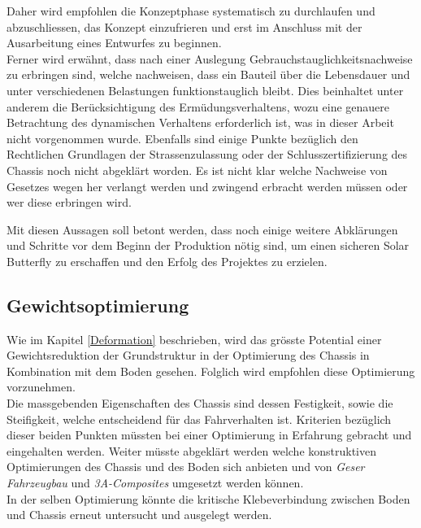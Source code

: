 Daher wird empfohlen die Konzeptphase systematisch zu durchlaufen und abzuschliessen, das Konzept einzufrieren und erst im Anschluss mit der Ausarbeitung eines Entwurfes zu beginnen.\\

Ferner wird erwähnt, dass nach einer Auslegung Gebrauchstauglichkeitsnachweise zu erbringen sind, welche nachweisen, dass ein Bauteil über die Lebensdauer und unter verschiedenen Belastungen funktionstauglich bleibt. Dies beinhaltet unter anderem die Berücksichtigung des Ermüdungsverhaltens, wozu eine genauere Betrachtung des dynamischen Verhaltens erforderlich ist, was in dieser Arbeit nicht vorgenommen wurde.
Ebenfalls sind einige Punkte bezüglich den Rechtlichen Grundlagen der Strassenzulassung oder der Schlusszertifizierung des Chassis noch nicht abgeklärt worden. Es ist nicht klar welche Nachweise von Gesetzes wegen her verlangt werden und zwingend erbracht werden müssen oder wer diese erbringen wird.

Mit diesen Aussagen soll betont werden, dass noch einige weitere Abklärungen und Schritte vor dem Beginn der Produktion nötig sind, um einen sicheren Solar Butterfly zu erschaffen und den Erfolg des Projektes zu erzielen.

\subsection{Gewichtsoptimierung}
Wie im Kapitel \ref{Deformation} beschrieben, wird das grösste Potential einer Gewichtsreduktion der Grundstruktur in der Optimierung des Chassis in Kombination mit dem Boden gesehen. Folglich wird empfohlen diese Optimierung vorzunehmen.\\
Die massgebenden Eigenschaften des Chassis sind dessen Festigkeit, sowie die Steifigkeit, welche entscheidend für das Fahrverhalten ist. Kriterien bezüglich dieser beiden Punkten müssten bei einer Optimierung in Erfahrung gebracht und eingehalten werden. Weiter müsste abgeklärt werden welche konstruktiven Optimierungen des Chassis und des Boden sich anbieten und von \emph{Geser Fahrzeugbau} und \emph{3A-Composites} umgesetzt werden können.\\
In der selben Optimierung könnte die kritische Klebeverbindung zwischen Boden und Chassis erneut untersucht und ausgelegt werden.

\newpage

